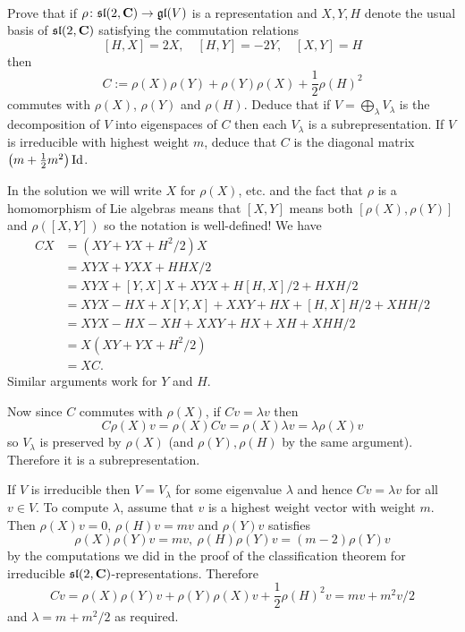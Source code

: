 \documentclass[12pt]{article}
\begin{document}
\begin{question}\ \\
Prove that if $\rho\colon\mathfrak{sl}(2,\mathbf{C})\to\mathfrak{gl}(V)$ is a representation and $X,Y,H$ denote the usual basis of $\mathfrak{sl}(2,\mathbf{C})$ satisfying the commutation relations
\[[H,X]=2X,\quad [H,Y]=-2Y,\quad [X,Y]=H\]
then
\[C:=\rho(X)\rho(Y)+\rho(Y)\rho(X)+\frac{1}{2}\rho(H)^2\]
commutes with $\rho(X)$, $\rho(Y)$ and $\rho(H)$. Deduce that if $V=\bigoplus_{\lambda}V_{\lambda}$ is the decomposition of $V$ into eigenspaces of $C$ then each $V_{\lambda}$ is a subrepresentation. If $V$ is irreducible with highest weight $m$, deduce that $C$ is the diagonal matrix $\left(m+\frac{1}{2}m^2\right)\operatorname{Id}$.
\end{question}

\begin{answer}
In the solution we will write $X$ for $\rho(X)$, etc. and the fact that $\rho$ is a homomorphism of Lie algebras means that $[X,Y]$ means both $[\rho(X),\rho(Y)]$ and $\rho([X,Y])$ so the notation is well-defined! We have
\begin{align*}
      CX      &=(XY+YX+H^2/2)X\\
              &=XYX+YXX+HHX/2\\
              &=XYX+[Y,X]X+XYX+H[H,X]/2+HXH/2\\
              &=XYX-HX+X[Y,X]+XXY+HX+[H,X]H/2+XHH/2\\
              &=XYX-HX-XH+XXY+HX+XH+XHH/2\\
              &=X(XY+YX+H^2/2)\\
              &=XC.
\end{align*}
Similar arguments work for $Y$ and $H$.

Now since $C$ commutes with $\rho(X)$, if $Cv=\lambda v$ then
\[C\rho(X)v=\rho(X)Cv=\rho(X)\lambda v=\lambda\rho(X)v\]
so $V_{\lambda}$ is preserved by $\rho(X)$ (and $\rho(Y),\rho(H)$ by the same argument). Therefore it is a subrepresentation.

If $V$ is irreducible then $V=V_{\lambda}$ for some eigenvalue $\lambda$ and hence $Cv=\lambda v$ for all $v\in V$. To compute $\lambda$, assume that $v$ is a highest weight vector with weight $m$. Then $\rho(X)v=0$, $\rho(H)v=mv$ and $\rho(Y)v$ satisfies
\[\rho(X)\rho(Y)v=mv,\ \rho(H)\rho(Y)v=(m-2)\rho(Y)v\]
by the computations we did in the proof of the classification theorem for irreducible $\mathfrak{sl}(2,\mathbf{C})$-representations. Therefore
\[Cv=\rho(X)\rho(Y)v+\rho(Y)\rho(X)v+\frac{1}{2}\rho(H)^2v=mv+m^2v/2\]
and $\lambda=m+m^2/2$ as required.
\end{answer}
\end{document}
